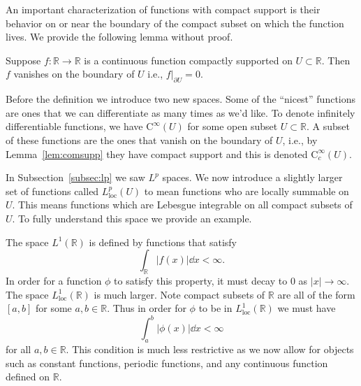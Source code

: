An important characterization of functions with compact support is their
behavior on or near the boundary of the compact subset on which the function
lives. We provide the following lemma without proof.

\begin{lemma}\label{lem:comsupp}
    Suppose \(f:\mathbb{R}\to\mathbb{R}\) is a continuous function compactly
    supported on \(U\subset\mathbb{R}\). Then \(f\) vanishes on the boundary of
    \(U\) i.e., \(f|_{\partial U} = 0\). 
\end{lemma}

Before the definition we introduce two new spaces. Some of the ``nicest''
functions are ones that we can differentiate as many times as we'd like. To
denote infinitely differentiable functions, we have \(\mathrm{C}^\infty(U)\) for
some open subset \(U\subset \mathbb{R}\). A subset of these functions are the
ones that vanish on the boundary of \(U\), i.e., by Lemma~\ref{lem:comsupp} they
have compact support and this is denoted \(\mathrm{C}_c^\infty(U)\).

In Subsection~\ref{subsec:lp} we saw \(L^p\) spaces. We now introduce a slightly
larger set of functions called \(L^p_\text{loc}(U)\) to mean functions who are
locally summable on \(U\). This means functions which are Lebesgue integrable on
all compact subsets of \(U\). To fully understand this space we provide an
example.

\begin{example}
    The space \(L^1(\mathbb{R})\) is defined by functions that satisfy
    \begin{equation*}
        \int_\mathbb{R}|f(x)|\dd{x} < \infty.
    \end{equation*}
    In order for a function \(\phi\) to satisfy this property, it must decay to
    0 as \(|x|\to\infty\). The space \(L^1_\text{loc}(\mathbb{R})\) is much
    larger. Note compact subsets of \(\mathbb{R}\) are all of the form \([a,b]\)
    for some \(a,b\in\mathbb{R}\). Thus in order for \(\phi\) to be in
    \(L^1_\text{loc}(\mathbb{R})\) we must have
    \begin{equation*}
        \int_a^b|\phi(x)|\dd{x} < \infty
    \end{equation*}
    for all \(a,b\in\mathbb{R}\). This condition is much less restrictive as we
    now allow for objects such as constant functions, periodic functions, and
    any continuous function defined on \(\mathbb{R}\).
\end{example}

